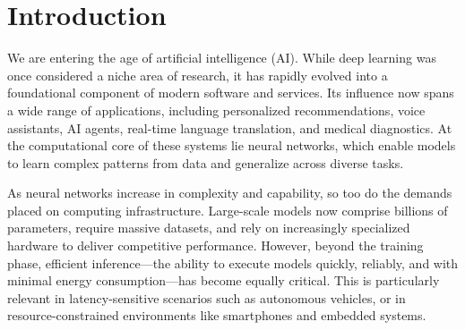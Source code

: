 \documentclass[modern,longauthor]{aastex7}
\begin{document}
\section{Introduction}\label{sec:introduction}
We are entering the age of artificial intelligence (AI). While deep learning was once considered a niche area of research, it has rapidly evolved into a foundational component of modern software and services. Its influence now spans a wide range of applications, including personalized recommendations, voice assistants, AI agents, real-time language translation, and medical diagnostics. At the computational core of these systems lie neural networks, which enable models to learn complex patterns from data and generalize across diverse tasks.

As neural networks increase in complexity and capability, so too do the demands placed on computing infrastructure. Large-scale models now comprise billions of parameters, require massive datasets, and rely on increasingly specialized hardware to deliver competitive performance. However, beyond the training phase, efficient inference—the ability to execute models quickly, reliably, and with minimal energy consumption—has become equally critical. This is particularly relevant in latency-sensitive scenarios such as autonomous vehicles, or in resource-constrained environments like smartphones and embedded systems.
\end{document}
